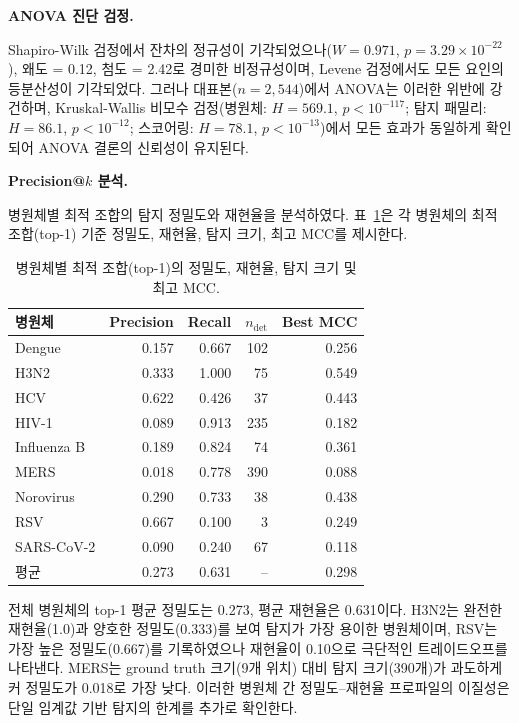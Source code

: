 \textbf{ANOVA 진단 검정.}
\label{subsec:anova_diagnostics}

Shapiro-Wilk 검정에서 잔차의 정규성이 기각되었으나($W = 0.971$, $p = 3.29 \times 10^{-22}$), 왜도 = 0.12, 첨도 = 2.42로 경미한 비정규성이며, Levene 검정에서도 모든 요인의 등분산성이 기각되었다.
그러나 대표본($n = 2{,}544$)에서 ANOVA는 이러한 위반에 강건하며, Kruskal-Wallis 비모수 검정(병원체: $H = 569.1$, $p < 10^{-117}$; 탐지 패밀리: $H = 86.1$, $p < 10^{-12}$; 스코어링: $H = 78.1$, $p < 10^{-13}$)에서 모든 효과가 동일하게 확인되어 ANOVA 결론의 신뢰성이 유지된다.


\textbf{Precision@$k$ 분석.}
\label{subsec:precision_at_k}

병원체별 최적 조합의 탐지 정밀도와 재현율을 분석하였다. 표~\ref{tab:precision_at_k}은 각 병원체의 최적 조합(top-1) 기준 정밀도, 재현율, 탐지 크기, 최고 MCC를 제시한다.

\begin{table}[htbp]
\centering
\caption{병원체별 최적 조합(top-1)의 정밀도, 재현율, 탐지 크기 및 최고 MCC.}
\label{tab:precision_at_k}
\begin{tabular}{lrrrr}
\toprule
병원체 & Precision & Recall & $n_{\text{det}}$ & Best MCC \\
\midrule
Dengue       & 0.157 & 0.667 & 102 & 0.256 \\
H3N2         & 0.333 & 1.000 &  75 & 0.549 \\
HCV          & 0.622 & 0.426 &  37 & 0.443 \\
HIV-1        & 0.089 & 0.913 & 235 & 0.182 \\
Influenza B  & 0.189 & 0.824 &  74 & 0.361 \\
MERS         & 0.018 & 0.778 & 390 & 0.088 \\
Norovirus    & 0.290 & 0.733 &  38 & 0.438 \\
RSV          & 0.667 & 0.100 &   3 & 0.249 \\
SARS-CoV-2   & 0.090 & 0.240 &  67 & 0.118 \\
\midrule
평균          & 0.273 & 0.631 &  -- & 0.298 \\
\bottomrule
\end{tabular}
\end{table}

전체 병원체의 top-1 평균 정밀도는 0.273, 평균 재현율은 0.631이다.
H3N2는 완전한 재현율(1.0)과 양호한 정밀도(0.333)를 보여 탐지가 가장 용이한 병원체이며, RSV는 가장 높은 정밀도(0.667)를 기록하였으나 재현율이 0.10으로 극단적인 트레이드오프를 나타낸다.
MERS는 ground truth 크기(9개 위치) 대비 탐지 크기(390개)가 과도하게 커 정밀도가 0.018로 가장 낮다.
이러한 병원체 간 정밀도--재현율 프로파일의 이질성은 단일 임계값 기반 탐지의 한계를 추가로 확인한다.


